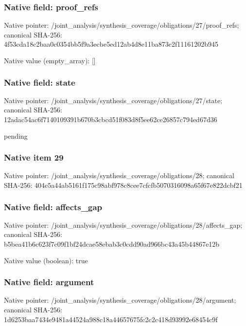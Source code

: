 \documentclass[10pt,a4paper]{article}
\begin{document}
\subsubsection{Native field: proof\_\allowbreak{}refs}
Native pointer: /joint\_\allowbreak{}analysis/synthesis\_\allowbreak{}coverage/obligations/27/proof\_\allowbreak{}refs; canonical SHA-256: 4f53cda18c2baa0c0354bb5f9a3ecbe5ed12ab4d8e11ba873c2f11161202b945

Native value (empty\_\allowbreak{}array): []

\subsubsection{Native field: state}
Native pointer: /joint\_\allowbreak{}analysis/synthesis\_\allowbreak{}coverage/obligations/27/state; canonical SHA-256: 12adac54ac6f7140109391b670b3cbcd51f083d8f5ee62ce26857c794ed67d36

\begingroup\raggedright\sloppy pending\par\endgroup

\subsubsection{Native item 29}
Native pointer: /joint\_\allowbreak{}analysis/synthesis\_\allowbreak{}coverage/obligations/28; canonical SHA-256: 404e5a44ab5161f175c98abf978c8cee7cfcfb5070316098a65f67e822dcbf21

\subsubsection{Native field: affects\_\allowbreak{}gap}
Native pointer: /joint\_\allowbreak{}analysis/synthesis\_\allowbreak{}coverage/obligations/28/affects\_\allowbreak{}gap; canonical SHA-256: b5bea41b6c623f7c09f1bf24dcae58ebab3c0cdd90ad966bc43a45b44867e12b

Native value (boolean): true

\subsubsection{Native field: argument}
Native pointer: /joint\_\allowbreak{}analysis/synthesis\_\allowbreak{}coverage/obligations/28/argument; canonical SHA-256: 1d6253baa7434e9481a44524a988c18a44657675fc2c2c418d93992e68454c9f
\end{document}
